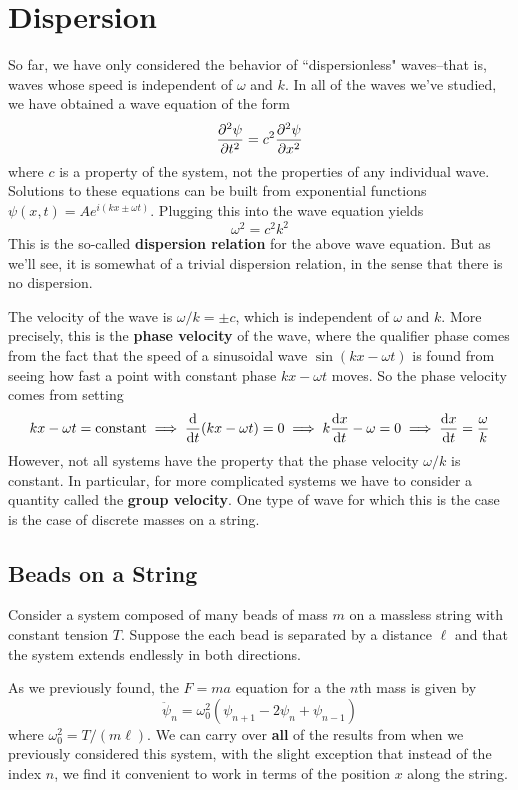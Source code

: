 \chapter{Dispersion}
So far, we have only considered the behavior of ``dispersionless" waves--that is, waves whose speed is independent of $\omega$ and $k$. In all of the waves we've studied, we have obtained a wave equation of the form 
\[ \pdv[2]{\psi}{t} = c^2\pdv[2]{\psi}{x} \]
where $c$ is a property of the system, not the properties of any individual wave. Solutions to these equations can be built from exponential functions $\psi(x,t) = Ae^{i(kx\pm \omega t)} $. Plugging this into the wave equation yields
\[ \omega^2 = c^2k^2\]
This is the so-called \textbf{dispersion relation} for the above wave equation. But as we'll see, it is somewhat of a trivial dispersion relation, in the sense that there is no dispersion.

The velocity of the wave is $\omega/k = \pm c$, which is independent of $\omega$ and $k$. More precisely, this is the \textbf{phase velocity} of the wave, where the qualifier phase comes from the fact that the speed of a sinusoidal wave $\sin(kx-\omega t)$ is found from seeing how fast a point with constant phase $kx-\omega t$ moves. So the phase velocity comes from setting
\[ kx - \omega t = \text{constant} \implies \dv{t} (kx-\omega t) =0 \implies k\dv{x}{t} - \omega = 0 \implies \dv{x}{t} = \frac{\omega}{k} \]
However, not all systems have the property that the phase velocity $\omega/k$ is constant. In particular, for more complicated systems we have to consider a quantity called the \textbf{group velocity}. One type of wave for which this is the case is the case of discrete masses on a string.
\section{Beads on a String}
Consider a system composed of many beads of mass $m$ on a massless string with constant tension $T$. Suppose the each bead is separated by a distance $\ell$ and that the system extends endlessly in both directions.

As we previously found, the $F=ma$ equation for a the $n$th mass is given by
\[ \ddot \psi_n = \omega_0^2(\psi_{n+1} - 2\psi_n + \psi_{n-1})\]
where $\omega_0^2 = T/(m\ell)$. We can carry over \textbf{all} of the results from when we previously considered this system, with the slight exception that instead of the index $n$, we find it convenient to work in terms of the position $x$ along the string.

